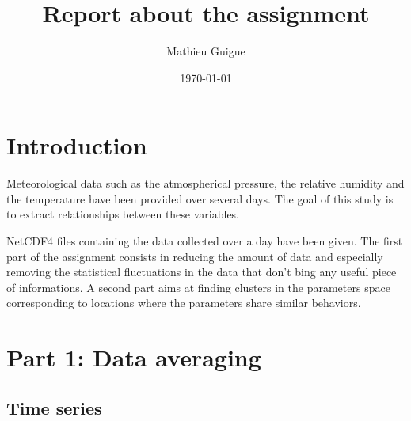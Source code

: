 \documentclass[11pt]{amsart}
\title{Report about the assignment}
\author{Mathieu Guigue}
\date{\today}                                           %
\begin{document}
\maketitle

\section{Introduction}

Meteorological data such as the atmospherical pressure, the relative humidity and the temperature have been provided over several days.
The goal of this study is to extract relationships between these variables.

NetCDF4 files containing the data collected over a day have been given.
The first part of the assignment consists in reducing the amount of data and especially removing the statistical fluctuations in the data that don't bing any useful piece of informations.
A second part aims at finding clusters in the parameters space corresponding to locations where the parameters share similar behaviors.

\section{Part 1: Data averaging}
\subsection{Time series}
\end{document}
